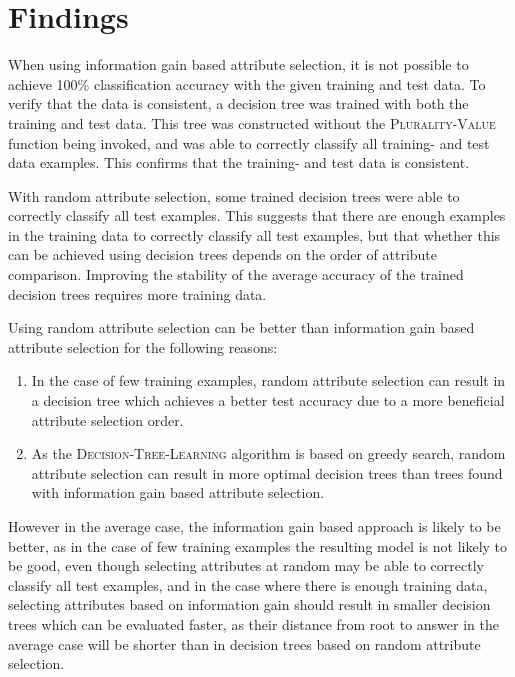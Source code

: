 \section{Findings}

When using information gain based attribute selection, it is not possible to achieve 100\% classification accuracy with the given training and test data. To verify that the data is consistent, a decision tree was trained with both the training and test data. This tree was constructed without the \textsc{Plurality-Value} function being invoked, and was able to correctly classify all training- and test data examples. This confirms that the training- and test data is consistent.

With random attribute selection, some trained decision trees were able to correctly classify all test examples. This suggests that there are enough examples in the training data to correctly classify all test examples, but that whether this can be achieved using decision trees depends on the order of attribute comparison. Improving the stability of the average accuracy of the trained decision trees requires more training data.

Using random attribute selection can be better than information gain based attribute selection for the following reasons:

\begin{enumerate}
\item In the case of few training examples, random attribute selection can result in a decision tree which achieves a better test accuracy due to a more beneficial attribute selection order.
\item As the \textsc{Decision-Tree-Learning} algorithm is based on greedy search, random attribute selection can result in more optimal decision trees than trees found with information gain based attribute selection.
\end{enumerate}

However in the average case, the information gain based approach is likely to be better, as in the case of few training examples the resulting model is not likely to be good, even though selecting attributes at random may be able to correctly classify all test examples, and in the case where there is enough training data, selecting attributes based on information gain should result in smaller decision trees which can be evaluated faster, as their distance from root to answer in the average case will be shorter than in decision trees based on random attribute selection.

